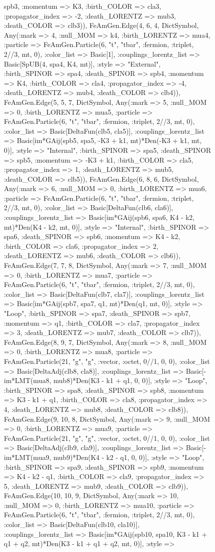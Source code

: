 \documentclass{revtex4}
\begin{document}
\begin{figure}[!htb]
\begin{center}
{spb3, :momentum => K3, :birth_COLOR => cla3, :propagator_index => -2, :death_LORENTZ => mub3, :death_COLOR => clb3)), FeAmGen.Edge(4, 6, 4, Dict{Symbol, Any}(:mark => 4, :null_MOM => k4, :birth_LORENTZ => mua4, :particle => FeAmGen.Particle(6, "t", "tbar", :fermion, :triplet, 2//3, mt, 0), :color_list => Basic[1], :couplings_lorentz_list => Basic[SpUB(4, spa4, K4, mt)], :style => "External", :birth_SPINOR => spa4, :death_SPINOR => spb4, :momentum => K4, :birth_COLOR => cla4, :propagator_index => -4, :death_LORENTZ => mub4, :death_COLOR => clb4)), FeAmGen.Edge(5, 5, 7, Dict{Symbol, Any}(:mark => 5, :null_MOM => 0, :birth_LORENTZ => mua5, :particle => FeAmGen.Particle(6, "t", "tbar", :fermion, :triplet, 2//3, mt, 0), :color_list => Basic[DeltaFun(clb5, cla5)], :couplings_lorentz_list => Basic[im*GAij(spb5, spa5, -K3 + k1, mt)*Den(-K3 + k1, mt, 0)], :style => "Internal", :birth_SPINOR => spa5, :death_SPINOR => spb5, :momentum => -K3 + k1, :birth_COLOR => cla5, :propagator_index => 1, :death_LORENTZ => mub5, :death_COLOR => clb5)), FeAmGen.Edge(6, 8, 6, Dict{Symbol, Any}(:mark => 6, :null_MOM => 0, :birth_LORENTZ => mua6, :particle => FeAmGen.Particle(6, "t", "tbar", :fermion, :triplet, 2//3, mt, 0), :color_list => Basic[DeltaFun(clb6, cla6)], :couplings_lorentz_list => Basic[im*GAij(spb6, spa6, K4 - k2, mt)*Den(K4 - k2, mt, 0)], :style => "Internal", :birth_SPINOR => spa6, :death_SPINOR => spb6, :momentum => K4 - k2, :birth_COLOR => cla6, :propagator_index => 2, :death_LORENTZ => mub6, :death_COLOR => clb6)), FeAmGen.Edge(7, 7, 8, Dict{Symbol, Any}(:mark => 7, :null_MOM => 0, :birth_LORENTZ => mua7, :particle => FeAmGen.Particle(6, "t", "tbar", :fermion, :triplet, 2//3, mt, 0), :color_list => Basic[DeltaFun(clb7, cla7)], :couplings_lorentz_list => Basic[im*GAij(spb7, spa7, q1, mt)*Den(q1, mt, 0)], :style => "Loop", :birth_SPINOR => spa7, :death_SPINOR => spb7, :momentum => q1, :birth_COLOR => cla7, :propagator_index => 3, :death_LORENTZ => mub7, :death_COLOR => clb7)), FeAmGen.Edge(8, 9, 7, Dict{Symbol, Any}(:mark => 8, :null_MOM => 0, :birth_LORENTZ => mua8, :particle => FeAmGen.Particle(21, "g", "g", :vector, :octet, 0//1, 0, 0), :color_list => Basic[DeltaAdj(clb8, cla8)], :couplings_lorentz_list => Basic[-im*LMT(mua8, mub8)*Den(K3 - k1 + q1, 0, 0)], :style => "Loop", :birth_SPINOR => spa8, :death_SPINOR => spb8, :momentum => K3 - k1 + q1, :birth_COLOR => cla8, :propagator_index => 4, :death_LORENTZ => mub8, :death_COLOR => clb8)), FeAmGen.Edge(9, 10, 8, Dict{Symbol, Any}(:mark => 9, :null_MOM => 0, :birth_LORENTZ => mua9, :particle => FeAmGen.Particle(21, "g", "g", :vector, :octet, 0//1, 0, 0), :color_list => Basic[DeltaAdj(clb9, cla9)], :couplings_lorentz_list => Basic[-im*LMT(mua9, mub9)*Den(K4 - k2 - q1, 0, 0)], :style => "Loop", :birth_SPINOR => spa9, :death_SPINOR => spb9, :momentum => K4 - k2 - q1, :birth_COLOR => cla9, :propagator_index => 5, :death_LORENTZ => mub9, :death_COLOR => clb9)), FeAmGen.Edge(10, 10, 9, Dict{Symbol, Any}(:mark => 10, :null_MOM => 0, :birth_LORENTZ => mua10, :particle => FeAmGen.Particle(6, "t", "tbar", :fermion, :triplet, 2//3, mt, 0), :color_list => Basic[DeltaFun(clb10, cla10)], :couplings_lorentz_list => Basic[im*GAij(spb10, spa10, K3 - k1 + q1 + q2, mt)*Den(K3 - k1 + q1 + q2, mt, 0)], :style => }
\end{center}
\end{figure}
\end{document}
